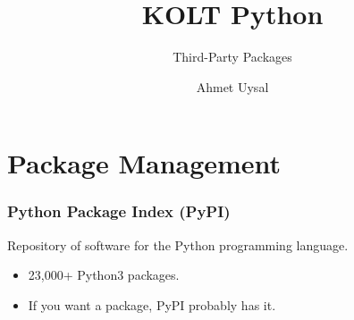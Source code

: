 

\usepackage{../KU-Beamer-Template/style/koc} 
\usepackage{minted}
\usepackage{upquote}
\usepackage{graphicx}

\title{KOLT Python}
\subtitle{Third-Party Packages} 
\date{}
\author{Ahmet Uysal}




    \maketitle


    \section{Package Management}

    \begin{frame}
        \frametitle{Python Package Index (PyPI)}
        \pause
        \huge
        Repository of software for the Python programming language.
        \pause
        \begin{itemize}
            \item 23,000+ Python3 packages.
            \pause
            \item If you want a package, PyPI probably has it. 
        \end{itemize}
    
    \end{frame}

